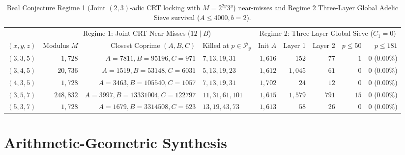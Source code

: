 \documentclass[11pt, a4paper]{amsart}
\theoremstyle{definition}
\newcommand{\Py}{\mathcal{P}_y}
\begin{document}
\begin{table}[htbp]
\centering
\caption{Beal Conjecture Regime 1 (Joint $(2,3)$-adic CRT locking with $M = 2^{2y} 3^y$) near-misses and Regime 2 Three-Layer Global Adelic Sieve survival ($A \le 4000, b=2$).}
\label{tab:beal_sieve}
\footnotesize
\begin{tabular}{@{}crrlrrrrr@{}}
\toprule
& \multicolumn{3}{c}{Regime 1: Joint CRT Near-Misses ($12 \mid B$)} & \multicolumn{5}{c}{Regime 2: Three-Layer Global Sieve ($C_1 = 0$)} \\
\cmidrule(lr){2-4} \cmidrule(l){5-9}
$(x,y,z)$ & Modulus $M$ & Closest Coprime $(A, B, C)$ & Killed at $p \in \Py$ & Init $A$ & Layer 1 & Layer 2 & $p \le 50$ & $p \le 181$ \\
\midrule
$(3,3,5)$ & $1,728$   & $A=7811, B=95196, C=971$       & $7, 13, 19, 31$   & $1,616$ & $152$   & $77$  & $1$  & $0$ ($0.00\%$) \\
$(3,4,5)$ & $20,736$  & $A=1519, B=53148, C=6031$      & $5, 13, 19, 23$   & $1,612$ & $1,045$ & $61$  & $0$  & $0$ ($0.00\%$) \\
$(4,3,5)$ & $1,728$   & $A=3463, B=105540, C=1057$     & $7, 13, 19, 31$   & $1,702$ & $24$    & $12$  & $0$  & $0$ ($0.00\%$) \\
$(3,5,7)$ & $248,832$ & $A=3997, B=13331004, C=122797$ & $11, 31, 61, 101$ & $1,615$ & $1,579$ & $791$ & $15$ & $0$ ($0.00\%$) \\
$(5,3,7)$ & $1,728$   & $A=1679, B=3314508, C=623$     & $13, 19, 43, 73$  & $1,613$ & $58$    & $26$  & $0$  & $0$ ($0.00\%$) \\
\bottomrule
\end{tabular}
\end{table}

\section{Arithmetic-Geometric Synthesis}
\end{document}
